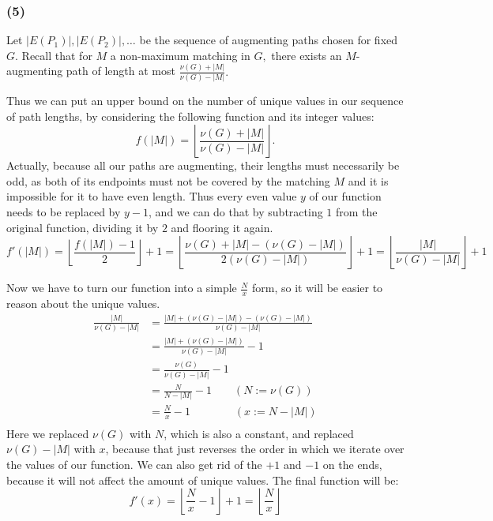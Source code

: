 \documentclass{article}
\begin{document}
  \subsubsection*{(5)} Let $|E(P_1)|,|E(P_2)|,\dots$ be the sequence of augmenting paths chosen for fixed $G.$ Recall that for $M$ a non-maximum matching in $G,$ there exists an $M$-augmenting path of length at most $\frac{\nu(G)+|M|}{\nu(G)-|M|}.$

  Thus we can put an upper bound on the number of unique values in our sequence of path lengths, by considering the following function and its integer values:
  $$f(|M|) = \left\lfloor\frac{\nu(G)+|M|}{\nu(G)-|M|}\right\rfloor.$$
  Actually, because all our paths are augmenting, their lengths must necessarily be odd, as both of its endpoints must not be covered by the matching $M$ and it is impossible for it to have even length.
  Thus every even value $y$ of our function needs to be replaced by $y-1$, and we can do that by subtracting $1$ from the original function, dividing it by $2$ and flooring it again.
  \[ f'(|M|) = \left\lfloor\frac{f(|M|)-1}{2}\right\rfloor+1
    = \left\lfloor\frac{\nu(G)+|M|-(\nu(G)-|M|)}{2(\nu(G)-|M|)}\right\rfloor+1
    = \left\lfloor\frac{|M|}{\nu(G)-|M|}\right\rfloor+1 \]

  Now we have to turn our function into a simple $\frac{N}{x}$ form, so it will be easier to reason about the unique values.
  \begin{align*}
    \frac{|M|}{\nu(G)-|M|} &= \frac{|M| + (\nu(G)-|M|) - (\nu(G)-|M|)}{\nu(G)-|M|} \\
    &= \frac{|M| + (\nu(G)-|M|)}{\nu(G)-|M|} - 1 \\
    &= \frac{\nu(G)}{\nu(G)-|M|} - 1 \\
    &= \frac{N}{N-|M|} - 1 \qquad (N := \nu(G)) \\
    &= \frac{N}{x} - 1 \qquad\qquad (x := N-|M|) \\
  \end{align*}
  Here we replaced $\nu(G)$ with $N$, which is also a constant, and replaced $\nu(G)-|M|$ with $x$, because that just reverses the order in which we iterate over the values of our function.
  We can also get rid of the $+1$ and $-1$ on the ends, because it will not affect the amount of unique values.
  The final function will be:
  \[ f'(x) = \left\lfloor\frac{N}{x} - 1\right\rfloor+1 = \left\lfloor\frac{N}{x}\right\rfloor \]
\end{document}
